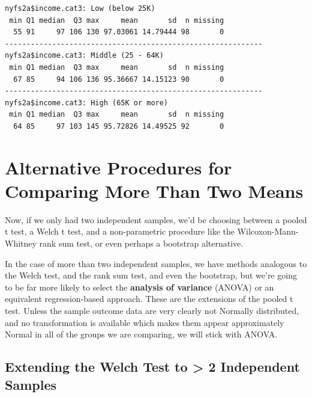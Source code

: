 \documentclass[
]{book}
\newenvironment{Shaded}{\begin{snugshade}}{\end{snugshade}}
\newcommand{\KeywordTok}[1]{\textcolor[rgb]{0.13,0.29,0.53}{\textbf{#1}}}
\newcommand{\NormalTok}[1]{#1}
\newcommand{\OperatorTok}[1]{\textcolor[rgb]{0.81,0.36,0.00}{\textbf{#1}}}
\begin{document}
\begin{Shaded}
\end{Shaded}

\begin{verbatim}
nyfs2a$income.cat3: Low (below 25K)
 min Q1 median  Q3 max     mean       sd  n missing
  55 91     97 106 130 97.03061 14.79444 98       0
------------------------------------------------------------ 
nyfs2a$income.cat3: Middle (25 - 64K)
 min Q1 median  Q3 max     mean       sd  n missing
  67 85     94 106 136 95.36667 14.15123 90       0
------------------------------------------------------------ 
nyfs2a$income.cat3: High (65K or more)
 min Q1 median  Q3 max     mean       sd  n missing
  64 85     97 103 145 95.72826 14.49525 92       0
\end{verbatim}

\hypertarget{alternative-procedures-for-comparing-more-than-two-means}{%
\section{Alternative Procedures for Comparing More Than Two Means}\label{alternative-procedures-for-comparing-more-than-two-means}}

Now, if we only had two independent samples, we'd be choosing between a pooled t test, a Welch t test, and a non-parametric procedure like the Wilcoxon-Mann-Whitney rank sum test, or even perhaps a bootstrap alternative.

In the case of more than two independent samples, we have methods analogous to the Welch test, and the rank sum test, and even the bootstrap, but we're going to be far more likely to select the \textbf{analysis of variance} (ANOVA) or an equivalent regression-based approach. These are the extensions of the pooled t test. Unless the sample outcome data are very clearly not Normally distributed, and no transformation is available which makes them appear approximately Normal in all of the groups we are comparing, we will stick with ANOVA.

\hypertarget{extending-the-welch-test-to-2-independent-samples}{%
\subsection{Extending the Welch Test to \textgreater{} 2 Independent Samples}\label{extending-the-welch-test-to-2-independent-samples}}
\end{document}
